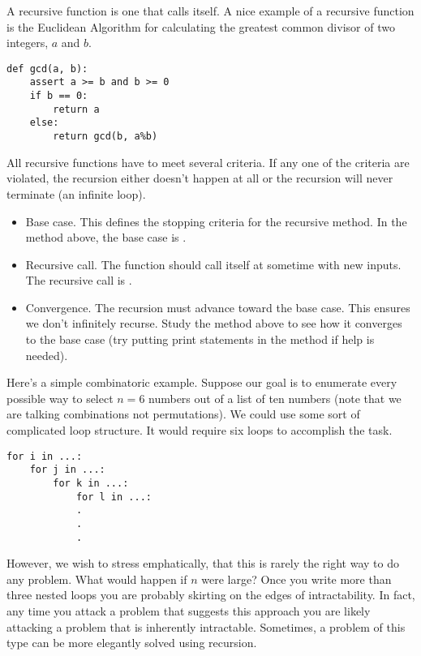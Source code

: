 

A recursive function is one that calls itself.  A nice example of a recursive function is the Euclidean Algorithm for calculating the greatest common divisor of two integers, $a$ and $b$.

\begin{lstlisting}[style=python]
def gcd(a, b):
    assert a >= b and b >= 0
    if b == 0:
        return a
    else:
        return gcd(b, a%b) 
\end{lstlisting}

All recursive functions have to meet several criteria.  If any one of the criteria are violated, the recursion either doesn't happen at all or the recursion will never terminate (an infinite loop).
\begin{itemize}
 \item Base case.  This defines the stopping criteria for the recursive method.  In the method above, the base case is .
 \item Recursive call.  The function should call itself at sometime with new inputs.  The recursive call is .
 \item Convergence. The recursion must advance toward the base case.  This ensures we don't infinitely recurse.  Study the method above to see how it converges to the base case (try putting print statements in the method if help is needed).
\end{itemize}

Here's a simple combinatoric example. Suppose our goal is to enumerate every possible way to select $n=6$ numbers out of a list of ten numbers (note that we are talking combinations not permutations). We could use some sort of complicated  loop structure.  It would require six loops to accomplish the task.

\begin{lstlisting}
for i in ...:
    for j in ...:
        for k in ...:
            for l in ...:
            .
            .
            .
\end{lstlisting}

However, we wish to stress emphatically, that this is rarely the right way to do any problem.  What would happen if $n$ were large? Once you write more than three nested  loops you are probably skirting on the edges of intractability.  In fact, any time you attack a problem that suggests this approach you are likely attacking a problem that is inherently intractable. Sometimes, a problem of this type can be more elegantly solved using recursion.

